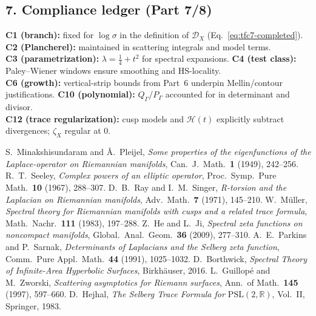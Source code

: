 \subsection*{7. Compliance ledger (Part 7/8)}\relax\hspace{0pt}
\label{subsec:tfc7-compliance}\relax\hspace{0pt}

\noindent
\textbf{C1 (branch):} fixed for $\log\sigma$ in the definition of $\mathscr{D}_X$ (Eq.~\eqref{eq:tfc7-completed}). \quad
\textbf{C2 (Plancherel):} maintained in scattering integrals and model terms. \\
\textbf{C3 (parametrization):} $\lambda=\tfrac14+t^2$ for spectral expansions. \quad
\textbf{C4 (test class):} Paley--Wiener windows ensure smoothing and HS-locality. \\
\textbf{C6 (growth):} vertical-strip bounds from Part~6 underpin Mellin/contour justifications. \quad
\textbf{C10 (polynomial):} $Q_\Gamma$/$P_\Gamma$ accounted for in determinant and divisor. \\
\textbf{C12 (trace regularization):} cusp models and $\mathcal{H}(t)$ explicitly subtract divergences; $\zeta_X$ regular at $0$. \relax\hspace{0pt}

\begin{thebibliography}{99} %
 S.~Minakshisundaram and \AA.~Pleijel, \emph{Some properties of the eigenfunctions of the Laplace-operator on Riemannian manifolds}, Can.\ J.\ Math.\ \textbf{1} (1949), 242--256. %
 R.~T.~Seeley, \emph{Complex powers of an elliptic operator}, Proc.\ Symp.\ Pure Math.\ \textbf{10} (1967), 288--307. %
 D.~B.~Ray and I.~M.~Singer, \emph{R-torsion and the Laplacian on Riemannian manifolds}, Adv.\ Math.\ \textbf{7} (1971), 145--210. %
 W.~M\"uller, \emph{Spectral theory for Riemannian manifolds with cusps and a related trace formula}, Math.\ Nachr.\ \textbf{111} (1983), 197--288. %
 Z.~He and L.~Ji, \emph{Spectral zeta functions on noncompact manifolds}, Global.\ Anal.\ Geom.\ \textbf{36} (2009), 277--310. %
 A.~E.~Parkins and P.~Sarnak, \emph{Determinants of Laplacians and the Selberg zeta function}, Comm.\ Pure Appl.\ Math.\ \textbf{44} (1991), 1025--1032. %
 D.~Borthwick, \emph{Spectral Theory of Infinite-Area Hyperbolic Surfaces}, Birkh\"auser, 2016. %
 L.~Guillop\'e and M.~Zworski, \emph{Scattering asymptotics for Riemann surfaces}, Ann.\ of Math.\ \textbf{145} (1997), 597--660. %
 D.~Hejhal, \emph{The Selberg Trace Formula for $\mathrm{PSL}(2,\mathbb{R})$}, Vol.~II, Springer, 1983. %
\end{thebibliography}

